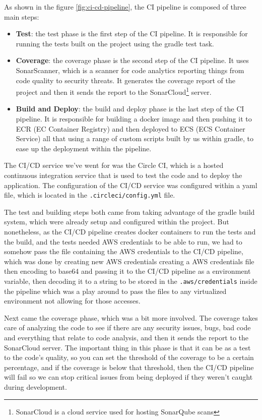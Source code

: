 As shown in the figure \ref{fig:ci-cd-pipeline}, the CI pipeline is composed
of three main steps:
    \begin{itemize}
        \item \textbf{Test}: the test phase is the first step of the CI pipeline.
            It is responsible for running the tests built on the project using
            the gradle test task.
        \item \textbf{Coverage}: the coverage phase is the second step of the CI pipeline.
            It uses SonarScanner, which is a scanner for code analytics reporting things
            from code quality to security threats. It generates the coverage report of the
            project and then it sends the report to the SonarCloud\footnote{SonarCloud is
                a cloud service used for hosting SonarQube scans} server.
        \item \textbf{Build and Deploy}: the build and deploy phase is the last step
            of the CI pipeline. It is responsible for building a docker image and then
            pushing it to ECR (EC Container Registry) and then deployed to ECS
            (ECS Container Service) all that using a range of custom scripts built
            by us within gradle, to ease up the deployment within the pipeline.
    \end{itemize}

The CI/CD service we've went for was the Circle CI, which is a hosted continuous
integration service that is used to test the code and to deploy the application.
The configuration of the CI/CD service was configured within a yaml file,
which is located in the \texttt{.circleci/config.yml} file.

The test and building steps both came from taking advantage of the gradle build
system, which were already setup and configured within the project. But nonetheless,
as the CI/CD pipeline creates docker containers to run the tests and the build,
and the tests needed AWS credentials to be able to run, we had to somehow pass
the file containing the AWS credentials to the CI/CD pipeline, which was done
by creating new AWS credentials creating a AWS credentials file then encoding to
base64 and passing it to the CI/CD pipeline as a environment variable, then decoding
it to a string to be stored in the \texttt{.aws/credentials} inside the pipeline which
was a play around to pass the files to any virtualized environment not allowing for 
those accesses.

Next came the coverage phase, which was a bit more involved. The coverage takes care
of analyzing the code to see if there are any security issues, bugs, bad code and
everything that relate to code analysis, and then it sends the report to the
SonarCloud server. The important thing in this phase is that it can be as a test to
the code's quality, so you can set the threshold of the coverage to be a certain
percentage, and if the coverage is below that threshold, then the CI/CD pipeline
will fail so we can stop critical issues from being deployed if they weren't caught
during development.

